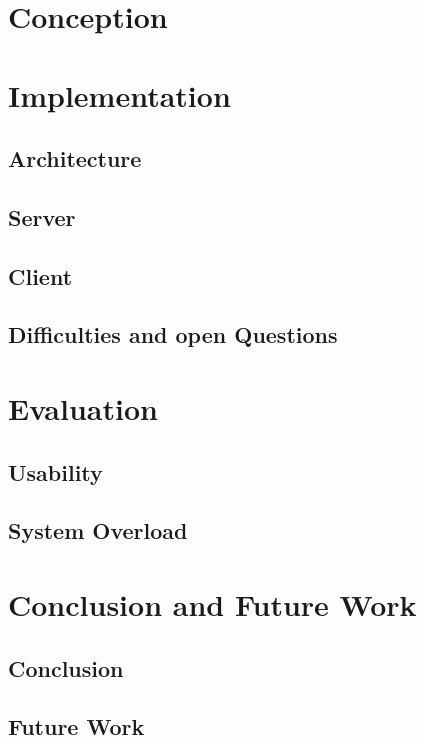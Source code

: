 \documentclass[english, BCOR=6mm, twoside=true, open=right]{tudscrreprt}
\begin{document}

\chapter{Conception}




\chapter{Implementation}
\section{Architecture}
\section{Server}
\section{Client}
\section{Difficulties and open Questions}


\chapter{Evaluation}
\section{Usability}
\section{System Overload}


\chapter{Conclusion and Future Work}
\section{Conclusion}
\section{Future Work}


\newpage
{}
\listoffigures

\newpage
{}
\listoftables

\newpage
{}
\printglossary

\newpage
{}


\end{document}
